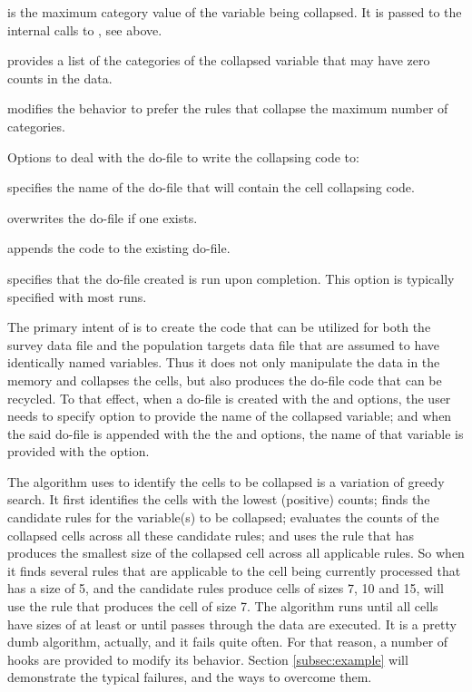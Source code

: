 \hangpara
{} is the maximum category value of the variable being collapsed.
It is passed to the internal calls to , see above.

\hangpara
{} provides a list of the categories of the collapsed
variable that may have zero counts in the data.

\hangpara
{} modifies the behavior  to prefer the rules
that collapse the maximum number of categories.

Options to deal with the do-file to write the collapsing code to:	

\hangpara
{} specifies the name of the do-file that will contain the cell collapsing code.

\hangpara
{} overwrites the do-file if one exists.

\hangpara
{} appends the code to the existing do-file.

\hangpara
{} specifies that the do-file created is run upon completion. This option is typically specified with most runs.

The primary intent of  is to create the code that can be
utilized for both the survey data file and the population targets data file that
are assumed to have identically named variables. Thus it does not only manipulate the data in the memory
and collapses the cells, but also produces the do-file code that can be recycled.
To that effect, when a do-file is created with the  and  options,
the user needs to specify  option to provide the name of the collapsed variable;
and when the said do-file is appended with the the  and  options,
the name of that variable is provided with the  option.

The algorithm  uses to identify the cells to be collapsed is
a variation of greedy search.
It first identifies the cells with the lowest (positive) counts; finds the candidate rules
for the variable(s) to be collapsed; evaluates the counts of the collapsed cells across all 
these candidate rules; and uses the rule that has produces the smallest size of the
collapsed cell across all applicable rules. So when it finds several rules that are applicable
to the cell being currently processed that has a size of 5, and the candidate rules produce cells
of sizes 7, 10 and 15,  will use the rule that produces the cell
of size 7. The algorithm runs until all cells have sizes of at least
 or until  passes through the data are executed.
It is a pretty dumb algorithm, actually, and it fails quite often. 
For that reason, a number of hooks are provided to modify its behavior.
Section \ref{subsec:example} will demonstrate the typical failures, and the ways to overcome them.

